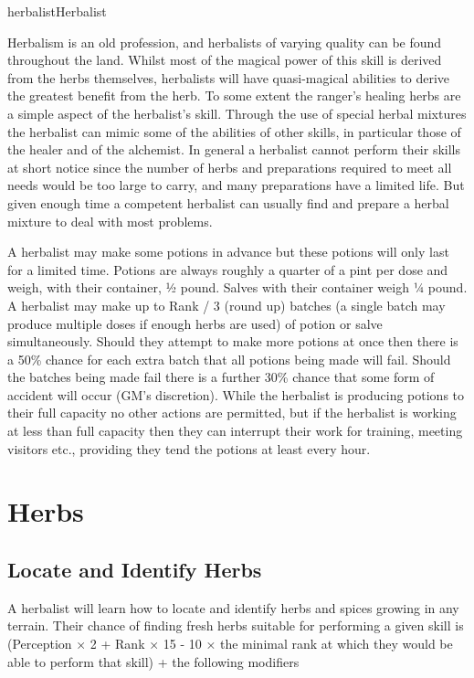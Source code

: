 \begin{Skill}[1.1]{herbalist}{Herbalist}

Herbalism is an old profession, and herbalists of varying quality can
be found throughout the land.  Whilst most of the magical power of
this skill is derived from the herbs themselves, herbalists will have
quasi-magical abilities to derive the greatest benefit from the
herb. To some extent the ranger’s healing herbs are a simple aspect of
the herbalist’s skill.  Through the use of special herbal mixtures the
herbalist can mimic some of the abilities of other skills, in
particular those of the healer and of the alchemist. In general a
herbalist cannot perform their skills at short notice since the number
of herbs and preparations required to meet all needs would be too
large to carry, and many preparations have a limited life. But given
enough time a competent herbalist can usually find and prepare a
herbal mixture to deal with most problems.

A herbalist may make some potions in advance but these potions will
only last for a limited time.  Potions are always roughly a quarter of
a pint per dose and weigh, with their container, ½ pound.  Salves with
their container weigh ¼ pound.  A herbalist may make up to Rank / 3
(round up) batches (a single batch may produce multiple doses if
enough herbs are used) of potion or salve simultaneously.  Should they
attempt to make more potions at once then there is a 50\% chance for
each extra batch that all potions being made will fail.  Should the
batches being made fail there is a further 30\% chance that some form
of accident will occur (GM’s discretion).  While the herbalist is
producing potions to their full capacity no other actions are
permitted, but if the herbalist is working at less than full capacity
then they can interrupt their work for training, meeting visitors
etc., providing they tend the potions at least every hour.

\section{Herbs}

\subsection{Locate and Identify Herbs}

A herbalist will learn how to locate and identify herbs and spices
growing in any terrain.  Their chance of finding fresh herbs suitable
for performing a given skill is (Perception × 2 + Rank × 15 - 10 ×
the minimal rank at which they would be able to perform that skill) +
the following modifiers


\end{Skill}
